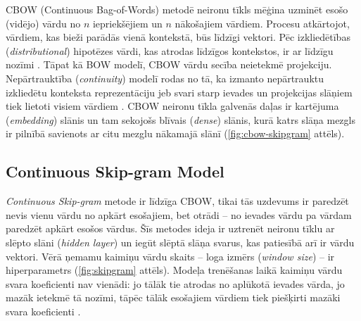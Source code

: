 CBOW (Continuous Bag-of-Words) metodē neironu tīkls mēģina uzminēt esošo (vidējo) vārdu no $n$ iepriekšējiem un $n$ nākošajiem vārdiem. Procesu atkārtojot, vārdiem, kas bieži parādās vienā kontekstā, būs līdzīgi vektori. Pēc izkliedētības (\textit{distributional}) hipotēzes vārdi, kas atrodas līdzīgos kontekstos, ir ar līdzīgu nozīmi \cite{word2vec2013}. Tāpat kā BOW modelī, CBOW vārdu secība neietekmē projekciju. Nepārtrauktība (\textit{continuity}) modelī rodas no tā, ka izmanto nepārtrauktu izkliedētu konteksta reprezentāciju
jeb svari starp ievades un projekcijas slāņiem tiek lietoti visiem vārdiem \cite{word2vec2013}.
CBOW neironu tīkla galvenās daļas ir kartējuma (\textit{embedding}) slānis un tam sekojošs blīvais (\textit{dense}) slānis, kurā katrs slāņa mezgls ir pilnībā savienots ar citu mezglu nākamajā slānī (\ref{fig:cbow-skipgram} attēls).



\subsection{Continuous Skip-gram Model}


\textit{Continuous Skip-gram} metode ir līdzīga CBOW, tikai tās uzdevums ir paredzēt nevis vienu vārdu no apkārt esošajiem, bet otrādi -- no ievades vārdu pa vārdam paredzēt apkārt esošos vārdus.
Šīs metodes ideja ir uztrenēt neironu tīklu ar slēpto slāni (\textit{hidden layer}) un iegūt slēptā slāņa svarus, kas patiesībā arī ir vārdu vektori. Vērā ņemamu kaimiņu vārdu skaits -- loga izmērs (\textit{window size}) -- ir hiperparametrs (\ref{fig:skipgram} attēls). Modeļa trenēšanas laikā kaimiņu vārdu svara koeficienti nav vienādi: jo tālāk tie atrodas no aplūkotā ievades vārda, jo mazāk ietekmē tā nozīmi, tāpēc tālāk esošajiem vārdiem tiek piešķirti mazāki svara koeficienti \cite{word2vec2013}. 


